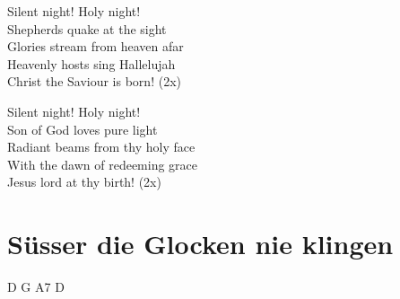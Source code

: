 \documentclass[
  letterpaper,
]{scrbook}
\begin{document}
Silent night! Holy night!\\
Shepherds quake at the sight\\
Glories stream from heaven afar\\
Heavenly hosts sing Hallelujah\\
Christ the Saviour is born! (2x)

Silent night! Holy night!\\
Son of God love\textquotesingle s pure light\\
Radiant beams from thy holy face\\
With the dawn of redeeming grace\\
Jesus lord at thy birth! (2x)

\hypertarget{suxfcsser-die-glocken-nie-klingen}{%
\chapter{Süsser die Glocken nie
klingen}\label{suxfcsser-die-glocken-nie-klingen}}

D G A7 D
\end{document}
